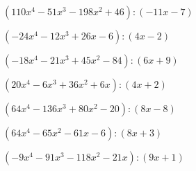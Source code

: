 \begin{esercizio}
\begin{enumeratea}
\item  \(\left(110 x^4 -51 x^3 -198 x^2 +46 \right) : \left(-11 x -7 \right)\)
\item  \(\left(-24 x^4 -12 x^3 +26 x -6 \right) : \left(4 x -2 \right)\)
\item  \(\left(-18 x^4 -21 x^3 +45 x^2 -84 \right) : \left(6 x +9 \right)\)
\item  \(\left(20 x^4 -6 x^3 +36 x^2 +6 x  \right) : \left(4 x +2 \right)\)
\item  \(\left(64 x^4 -136 x^3 +80 x^2 -20 \right) : \left(8 x -8 \right)\)
\item  \(\left(64 x^4 -65 x^2 -61 x -6 \right) : \left(8 x +3 \right)\)
\item  \(\left(-9 x^4 -91 x^3 -118 x^2 -21 x  \right) : \left(9 x +1 \right)\)
\end{enumeratea}
\end{esercizio}


